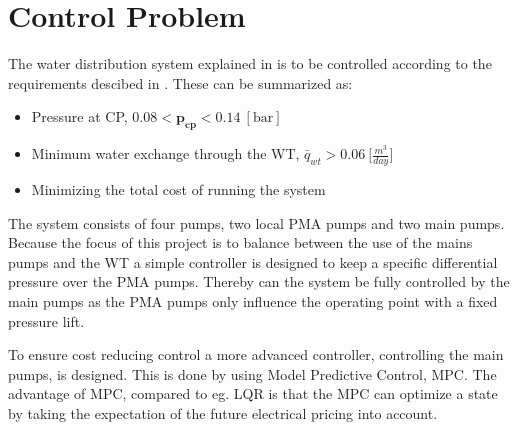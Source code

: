 \section{Control Problem}
\label{control_problem}
The water distribution system explained in  is to be controlled according to the requirements descibed in . These can be summarized as: 
\begin{itemize}
	\item Pressure at CP, $0.08 < \pmb{p_{cp}} < 0.14 \:[\text{bar}]$
%
	\item Minimum water exchange through the WT, $\bar{q}_{wt} > 0.06 \: \big[\frac{m^3}{day}\big]$
%
	\item Minimizing the total cost of running the system
\end{itemize}

The system consists of four pumps, two local PMA pumps and two main pumps. Because the focus of this project is to balance between the use of the mains pumps and the WT a simple controller is designed to keep a specific differential pressure over the PMA pumps. Thereby can the system be fully controlled by the main pumps as the PMA pumps only influence the operating point with a fixed pressure lift.

To ensure cost reducing control a more advanced controller, controlling the main pumps, is designed. This is done by using Model Predictive Control, MPC. The advantage of MPC, compared to eg. LQR is that the MPC can optimize a state by taking the expectation of the future electrical pricing into account. 

